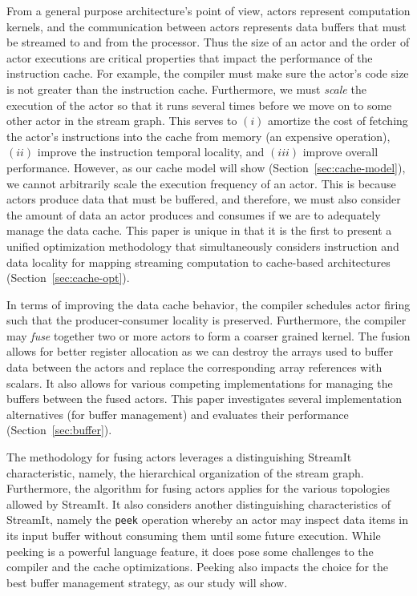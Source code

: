 From a general purpose architecture's point of view, actors represent
computation kernels, and the communication between actors represents
data buffers that must be streamed to and from the processor. Thus
the size of an actor and the
order of actor executions are critical properties that
impact the performance of the instruction cache. For example, the
compiler must make sure the actor's code size is not
greater than the instruction cache. Furthermore, we must {\it scale}
the execution of the actor so that it runs several times before we move
on to some other actor in the stream 
graph. This serves to $(i)$ amortize the cost of fetching the actor's
instructions into the cache from memory (an expensive operation), $(ii)$
improve the instruction temporal locality, and $(iii)$ improve overall
performance. However, as our cache model will show
(Section~\ref{sec:cache-model}), we 
cannot arbitrarily scale the execution frequency of an actor. This
is because actors produce data that must be buffered, and therefore,
we must also consider the amount of data an actor produces and
consumes if we are to adequately manage the data cache. This paper is unique
in that it is the first to present a unified optimization methodology
that simultaneously considers instruction and data locality for
mapping streaming computation to cache-based architectures (Section~\ref{sec:cache-opt}).

In terms of improving the data cache behavior, the compiler schedules
actor firing such that the producer-consumer locality is
preserved. Furthermore,  the compiler may {\it fuse}
together two or more actors to form a coarser grained kernel.
The fusion allows for better register allocation as we can
destroy the arrays used to buffer data between the actors and replace
the corresponding array references with scalars.  It also allows for
various competing implementations for managing the buffers between the
fused actors.  This paper investigates several implementation
alternatives (for buffer management) and evaluates their performance
(Section~\ref{sec:buffer}).

The methodology for fusing actors leverages a distinguishing StreamIt
characteristic, namely, the hierarchical organization of
the stream graph. Furthermore, the algorithm for fusing actors applies
for the various topologies allowed by StreamIt.
It also considers another distinguishing characteristics of StreamIt,
namely the {\tt peek} operation whereby an actor may inspect data
items in its input buffer without consuming them until some future
execution. While peeking is a powerful language feature, it does pose
some challenges to the compiler and the cache optimizations. Peeking
also impacts the choice for the best buffer management strategy, as our
study will show.

